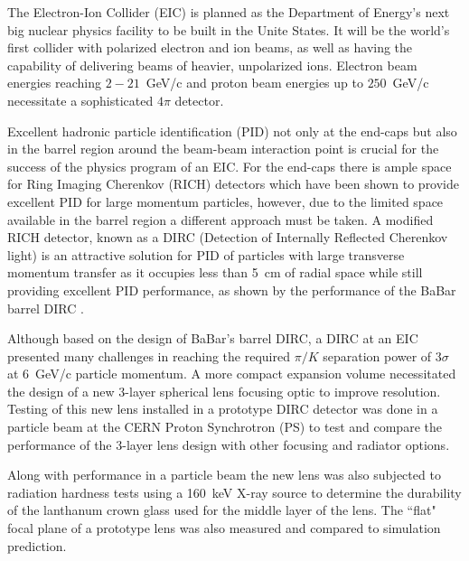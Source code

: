 \label{ch:intro}
The Electron-Ion Collider (EIC) is planned as the Department of Energy's next big nuclear physics facility to be built in the Unite States. It will be the world's first collider with polarized electron and ion beams, as well as having the capability of delivering beams of heavier, unpolarized ions. Electron beam energies reaching $2-21$~GeV/c and proton beam energies up to $250$~GeV/c necessitate a sophisticated $4\pi$ detector. 

Excellent hadronic particle identification (PID) not only at the end-caps but also in the barrel region around the beam-beam interaction point is crucial for the success of the physics program of an EIC. For the end-caps there is ample space for Ring Imaging Cherenkov (RICH) detectors which have been shown to provide excellent PID for large momentum particles, however, due to the limited space available in the barrel region a different approach must be taken. A modified RICH detector, known as a DIRC (Detection of Internally Reflected Cherenkov light) is an attractive solution for PID of particles with large transverse momentum transfer as it occupies less than 5~cm of radial space while still providing excellent PID performance, as shown by the performance of the BaBar barrel DIRC \cite{BaBarDIRC}.

Although based on the design of BaBar's barrel DIRC, a DIRC at an EIC presented many challenges in reaching the required $\pi/K$ separation power of $3\sigma$ at 6~GeV/c particle momentum. A more compact expansion volume necessitated the design of a new 3-layer spherical lens focusing optic to improve resolution. Testing of this new lens installed in a prototype DIRC detector was done in a particle beam at the CERN Proton Synchrotron (PS) to test and compare the performance of the 3-layer lens design with other focusing and radiator options.

Along with performance in a particle beam the new lens was also subjected to radiation hardness tests using a 160~keV X-ray source to determine the durability of the lanthanum crown glass used for the middle layer of the lens. The ``flat" focal plane of a prototype lens was also measured and compared to simulation prediction.